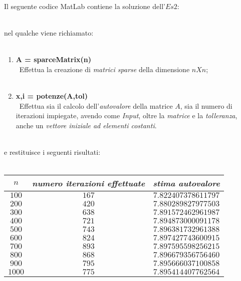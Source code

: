 Il seguente codice MatLab contiene la soluzione dell'$Es 2$:\\\
	
nel qualche viene richiamato:\\\
	\begin{enumerate}
		\item \textbf{A = sparceMatrix(n)}\\\
			Effettua la creazione di \textit{matrici sparse} della dimensione $nXn$;\\\
		\item \textbf{x,i = potenze(A,tol)}\\\
			Effettua sia il calcolo dell'\textit{autovalore} della matrice $A$, sia il numero di iterazioni impiegate, avendo come \textit{Input}, oltre la 	\textit{matrice} e la \textit{tolleranza}, anche un \textit{vettore iniziale ad elementi costanti}.\\\
				
	\end{enumerate}
e restituisce i seguenti risultati:\\\
	\begin{center}
		\begin{tabular}{|c|c|c|}
			\hline
				$n$ & \textit{numero iterazioni effettuate} & \textit{stima autovalore} \\
			\hline
				$100$ & $167$ & $7.822407378611797$ \\
				$200$ & $420$ & $7.880289827977503$ \\
				$300$ & $638$ & $7.891572462961987$ \\
				$400$ & $721$ & $7.894873000091178$ \\
				$500$ & $743$ & $7.896381732961388$ \\
				$600$ & $824$ & $7.897427743600915$ \\
				$700$ & $893$ & $7.897595598256215$ \\
				$800$ & $868$ & $7.896679356756460$ \\
				$900$ & $795$ & $7.895666037100858$ \\
				$1000$ & $775$ & $7.895414407762564$ \\
			\hline 
		\end{tabular}
	\end{center}